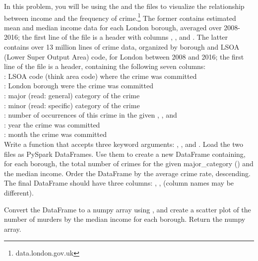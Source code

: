 \begin{problem}
In this problem, you will be using the  and the  files to visualize the relationship between income and the frequency of crime.\footnote{data.london.gov.uk}
The former contains estimated mean and median income data for each London borough, averaged over 2008-2016;
the first line of the file is a header with columns , , and .
The latter contains over 13 million lines of crime data, organized by borough and LSOA (Lower Super Output Area) code, for London between 2008 and 2016;
the first line of the file is a header, containing the following seven columns:\\

: LSOA code (think area code) where the crime was committed\\
\indent{}: London borough were the crime was committed\\
\indent{}: major (read: general) category of the crime\\
\indent{}: minor (read: specific) category of the crime\\
\indent{}: number of occurrences of this crime in the given , , and \\
\indent{}: year the crime was committed\\
\indent{}: month the crime was committed\\

Write a function that accepts three keyword arguments: , , and . Load the two files as PySpark DataFrames. 
Use them to create a new DataFrame containing, for each borough, the total number of crimes for the given major\_category () and the median income. 
Order the DataFrame by the average crime rate, descending. 
The final DataFrame should have three columns: , ,  (column names may be different).

 
Convert the DataFrame to a numpy array using , and create a scatter plot of the number of murders by the median income for each borough. 
Return the numpy array.

\label{prob:spark-df-hard}
\end{problem}

